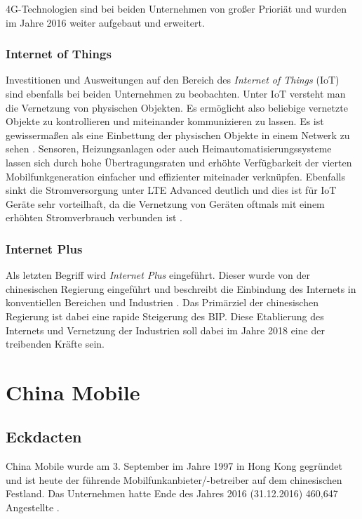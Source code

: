 4G-Technologien sind bei beiden Unternehmen von großer Prioriät und wurden im Jahre 2016 weiter aufgebaut und erweitert.

\subsubsection{Internet of Things}

Investitionen und Ausweitungen auf den Bereich des \textit{Internet of Things} (IoT) sind ebenfalls bei beiden Unternehmen zu beobachten. Unter IoT versteht man die Vernetzung von physischen Objekten. Es ermöglicht also beliebige vernetzte Objekte zu kontrollieren und miteinander kommunizieren zu lassen. Es ist gewissermaßen als eine Einbettung der physischen Objekte in einem Netwerk zu sehen \cite{iotcisco}. Sensoren, Heizungsanlagen oder auch Heimautomatisierungssysteme lassen sich durch hohe Übertragungsraten und erhöhte Verfügbarkeit der vierten Mobilfunkgeneration einfacher und effizienter miteinader verknüpfen. Ebenfalls sinkt die Stromversorgung unter LTE Advanced deutlich und dies ist für IoT Geräte sehr vorteilhaft, da die Vernetzung von Geräten oftmals mit einem erhöhten Stromverbrauch verbunden ist \cite{energy}.  

\subsubsection{Internet Plus}

Als letzten Begriff wird \textit{Internet Plus} eingeführt. Dieser wurde von der chinesischen Regierung eingeführt und beschreibt die Einbindung des Internets in konventiellen Bereichen und Industrien \cite{internetplus}. Das Primärziel der chinesischen Regierung ist dabei eine rapide Steigerung des BIP. Diese Etablierung des Internets und Vernetzung der Industrien soll dabei im Jahre 2018 eine der treibenden Kräfte sein.  

\section{China Mobile}
\label{sec:china}
\subsection{Eckdacten}

China Mobile wurde am 3. September im Jahre 1997 in Hong Kong gegründet und ist heute der führende Mobilfunkanbieter/-betreiber auf dem chinesischen Festland. Das Unternehmen hatte Ende des Jahres 2016 (31.12.2016) 460,647 Angestellte \cite{chinasite}.

